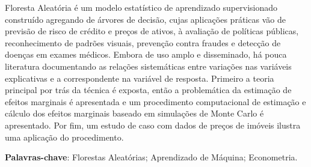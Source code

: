%
%

\begin{resumo}

Floresta Aleatória é um modelo estatístico de aprendizado supervisionado construído agregando de árvores de decisão, cujas aplicações práticas vão de previsão de risco de crédito e preços de ativos, à avaliação de políticas públicas, reconhecimento de padrões visuais, prevenção contra fraudes e detecção de doenças em exames médicos. Embora de uso amplo e disseminado, há pouca literatura documentando as relações sistemáticas entre variações nas variáveis explicativas e a correspondente na variável de resposta. Primeiro a teoria principal por trás da técnica é exposta, então a problemática da estimação de efeitos marginais é apresentada e um procedimento computacional de estimação e cálculo dos efeitos marginais baseado em simulações de Monte Carlo é apresentado. Por fim, um estudo de caso com dados de preços de imóveis ilustra uma aplicação do procedimento. 


\textbf{Palavras-chave}: Florestas Aleatórias; Aprendizado de Máquina; Econometria. %
\end{resumo}


